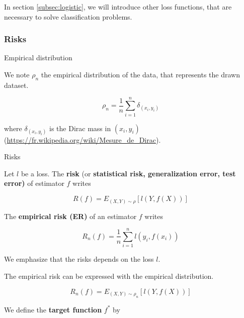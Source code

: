 \documentclass[
10pt, %
a4paper, %
oneside, %
headinclude,footinclude, %
BCOR5mm, %
]{scrartcl}
\begin{document}
In section \ref{subsec:logistic}, we will introduce other loss functions, that are necessary to solve classification problems.

\subsubsection{\large\color{Periwinkle}Risks}

\begin{definition}{Empirical distribution}

    We note $\rho_n$ the empirical distribution of the data, that represents the drawn dataset.

    \begin{equation}
	\rho_n = \frac{1}{n} \sum^{n}_{i=1} \delta_{(x_i, y_i)}
    \end{equation}

    where $\delta_{(x_i, y_i)}$ is the Dirac mass in $(x_i, y_i)$ (\url{https://fr.wikipedia.org/wiki/Mesure_de_Dirac}).
\end{definition}

\begin{definition}{Risks}

    Let $l$ be a loss. The \textbf{{risk}} (or \textbf{{statistical risk, generalization error, test error)}} of estimator $f$ writes

    \begin{equation}
	R(f)=E_{(X,Y)\sim \rho}[l(Y,f(X))]
    \end{equation}

    The \textbf{{empirical risk (ER)}} of an estimator $f$ writes

    \begin{equation}
	R_n(f) = \frac{1}{n} \sum^{n}_{i=1} l(y_i, f(x_i))
    \end{equation}

    We emphasize that the risks depends on the loss $l$.
\end{definition}

\begin{remark}

    The empirical risk can be expressed with the empirical distribution.

    \begin{equation}
        R_n(f)=E_{(X,Y)\sim \rho_n}[l(Y,f(X))]
    \end{equation}
\end{remark}

We define the \textbf{{target function}} $f^*$ by
\end{document}
